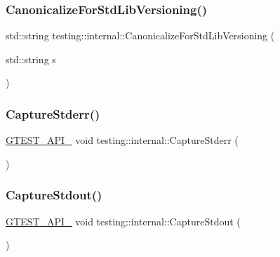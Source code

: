 \mbox{\label{namespacetesting_1_1internal_a5342e843f087081705094beae07b557b}} 
\subsubsection{\texorpdfstring{CanonicalizeForStdLibVersioning()}{CanonicalizeForStdLibVersioning()}}
{\footnotesize\ttfamily std\+::string testing\+::internal\+::\+Canonicalize\+For\+Std\+Lib\+Versioning (\begin{DoxyParamCaption}\item[{std\+::string}]{s }\end{DoxyParamCaption})\hspace{0.3cm}{\ttfamily [inline]}}

\mbox{\label{namespacetesting_1_1internal_a8ec00d458d0d442bd64af7b5f9c22dda}} 
\subsubsection{\texorpdfstring{CaptureStderr()}{CaptureStderr()}}
{\footnotesize\ttfamily \mbox{\hyperlink{_obj__test_2lib_2googletest-release-1_88_81_2googletest_2include_2gtest_2internal_2gtest-port_8h_aa73be6f0ba4a7456180a94904ce17790}{G\+T\+E\+S\+T\+\_\+\+A\+P\+I\+\_\+}} void testing\+::internal\+::\+Capture\+Stderr (\begin{DoxyParamCaption}{ }\end{DoxyParamCaption})}

\mbox{\label{namespacetesting_1_1internal_acba06d4f0343dec407738ba5544af990}} 
\subsubsection{\texorpdfstring{CaptureStdout()}{CaptureStdout()}}
{\footnotesize\ttfamily \mbox{\hyperlink{_obj__test_2lib_2googletest-release-1_88_81_2googletest_2include_2gtest_2internal_2gtest-port_8h_aa73be6f0ba4a7456180a94904ce17790}{G\+T\+E\+S\+T\+\_\+\+A\+P\+I\+\_\+}} void testing\+::internal\+::\+Capture\+Stdout (\begin{DoxyParamCaption}{ }\end{DoxyParamCaption})}

